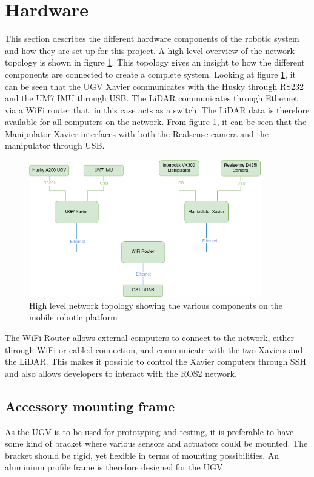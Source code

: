 
  
\section{Hardware}\label{sec:H:Hardware}
This section describes the different hardware components of the robotic system and how they are set up for this project. A high level overview of the network topology is shown in figure \ref{fig:topology}. This topology gives an insight to how the different components are connected to create a complete system. Looking at figure \ref{fig:topology}, it can be seen that the UGV Xavier communicates with the Husky through RS232 and the UM7 IMU through USB. The LiDAR communicates through Ethernet via a WiFi router that, in this case acts as a switch. The LiDAR data is therefore available for all computers on the network. From figure \ref{fig:topology}, it can be seen that the Manipulator Xavier interfaces with both the Realsense camera and the manipulator through USB. 

\begin{figure}[H]
  \centering
  \includegraphics[width = 0.9\textwidth]{Figures/example_figure.drawio.png}
  \caption{High level network topology showing the various components on the mobile robotic platform}
  \label{fig:topology}
\end{figure}

The WiFi Router allows external computers to connect to the network, either through WiFi or cabled connection, and communicate with the two Xaviers and the LiDAR. This makes it possible to control the Xavier computers through SSH and also allows developers to interact with the ROS2 network.

\subsection{Accessory mounting frame}\label{sec:M:H:AccessoryMountingFrame}
As the UGV is to be used for prototyping and testing, it is preferable to have some kind of bracket where various sensors and actuators could be mounted. The bracket should be rigid, yet flexible in terms of mounting possibilities. An aluminium profile frame is therefore designed for the UGV.

